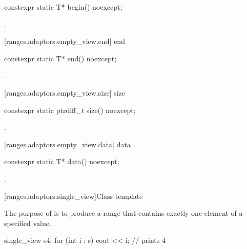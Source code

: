 %
\begin{itemdecl}
constexpr static T* begin() noexcept;
\end{itemdecl}

\begin{itemdescr}
\pnum
\returns {}.
\end{itemdescr}

[ranges.adaptors.empty_view.end]{ end}

%
\begin{itemdecl}
constexpr static T* end() noexcept;
\end{itemdecl}

\begin{itemdescr}
\pnum
\returns {}.
\end{itemdescr}

[ranges.adaptors.empty_view.size]{ size}

%
\begin{itemdecl}
constexpr static ptrdiff_t size() noexcept;
\end{itemdecl}

\begin{itemdescr}
\pnum
\returns {}.
\end{itemdescr}

[ranges.adaptors.empty_view.data]{ data}

%
\begin{itemdecl}
constexpr static T* data() noexcept;
\end{itemdecl}

\begin{itemdescr}
\pnum
\returns {}.
\end{itemdescr}

[ranges.adaptors.single_view]{Class template }

\pnum
The purpose of  is to produce a range that contains exactly
one element of a specified value.

\pnum
\enterexample
\begin{codeblock}
single_view s{4};
for (int i : s)
  cout << i; // prints 4
\end{codeblock}
\exitexample

